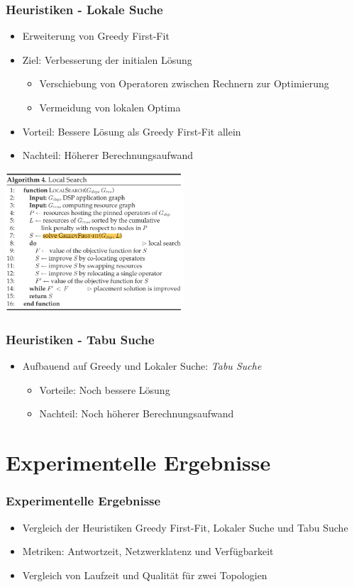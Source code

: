 \documentclass{beamer}
\begin{document}
\begin{frame}
\frametitle{Heuristiken - Lokale Suche}
\begin{itemize}
    \item Erweiterung von Greedy First-Fit
    \item Ziel: Verbesserung der initialen Lösung
    \begin{itemize}
        \item Verschiebung von Operatoren zwischen Rechnern zur Optimierung
        \item Vermeidung von lokalen Optima
    \end{itemize}
    \item Vorteil: Bessere Lösung als Greedy First-Fit allein
    \item Nachteil: Höherer Berechnungsaufwand
\end{itemize}
    \begin{center}
        \includegraphics[width=0.5\textwidth]{res/algorithmus-lokale-suche.png}
    \end{center}

\end{frame}

\begin{frame}
\frametitle{Heuristiken - Tabu Suche}
\begin{itemize}
    \item Aufbauend auf Greedy und Lokaler Suche: \textit{Tabu Suche}
    \begin{itemize}
        \item Vorteile: Noch bessere Lösung
        \item Nachteil: Noch höherer Berechnungsaufwand
    \end{itemize}
\end{itemize}
\end{frame}

\section{Experimentelle Ergebnisse}
\begin{frame}
\frametitle{Experimentelle Ergebnisse}
\begin{itemize}
    \item Vergleich der Heuristiken Greedy First-Fit, Lokaler Suche und Tabu Suche
    \item Metriken: Antwortzeit, Netzwerklatenz und Verfügbarkeit
    \item Vergleich von Laufzeit und Qualität für zwei Topologien
\end{itemize}
\vspace{0.3cm}
\end{frame}
\end{document}
